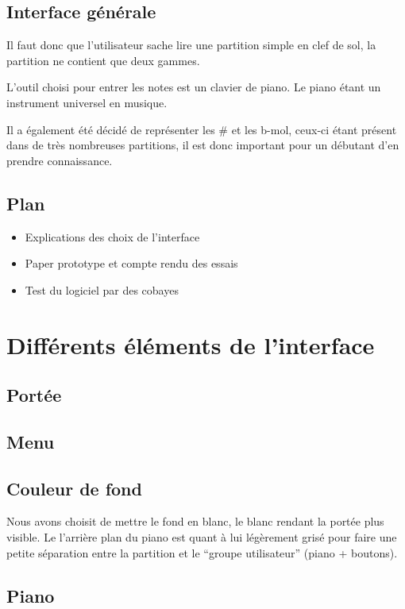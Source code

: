 \documentclass{article}
\begin{document}
\subsection{Interface générale}

\vspace{1cm}

Il faut donc que l'utilisateur sache lire une partition simple en clef de sol, la partition ne contient que deux gammes.

L'outil choisi pour entrer les notes est un clavier de piano. Le piano étant un instrument universel en musique.

Il a également été décidé de représenter les  \# 
{ }et les b-mol, ceux-ci étant présent dans de très nombreuses partitions, il est donc
important pour un débutant d'en prendre connaissance.


\subsection{Plan}
\begin{itemize}
\item Explications des choix de l'interface
\item Paper prototype et compte rendu des essais
\item Test du logiciel par des cobayes
\end{itemize}

\newpage
\section{Différents éléments de l'interface}



\subsection{Portée}
\subsection{Menu}

\subsection{Couleur de fond}
Nous avons choisit de mettre le fond en blanc, le blanc rendant la portée plus visible.
Le l'arrière plan du piano est quant à lui légèrement grisé pour faire une petite séparation entre la partition et le 
``groupe utilisateur'' (piano + boutons).
\subsection{Piano}
\end{document}

